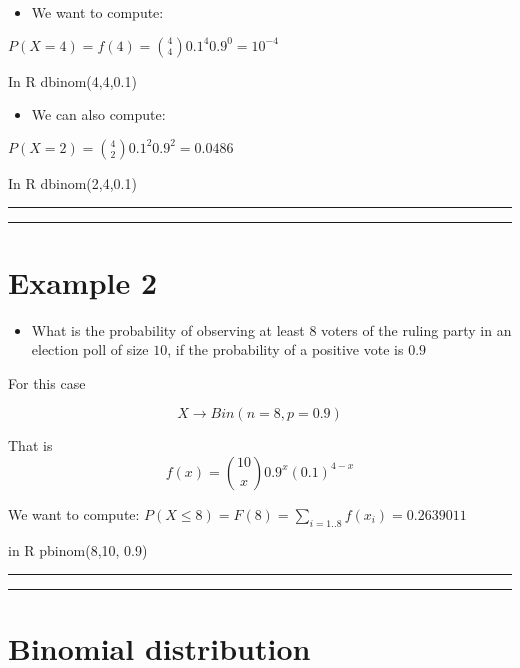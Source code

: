 \documentclass[
]{book}
\providecommand{\tightlist}{%
  \setlength{\itemsep}{0pt}\setlength{\parskip}{0pt}}
\begin{document}
\begin{itemize}
\tightlist
\item
  We want to compute:
\end{itemize}

\(P(X=4)=f(4)=\binom 4 4 0.1^4 0.9^{0}=10^{-4}\)

In R dbinom(4,4,0.1)

\begin{itemize}
\tightlist
\item
  We can also compute:
\end{itemize}

\(P(X=2)=\binom 4 2 0.1^2 0.9^2=0.0486\)

In R dbinom(2,4,0.1)

\begin{center}\rule{0.5\linewidth}{0.5pt}\end{center}

\begin{center}\rule{0.5\linewidth}{0.5pt}\end{center}

\hypertarget{example-2-1}{%
\section{Example 2}\label{example-2-1}}

\begin{itemize}
\tightlist
\item
  What is the probability of observing at least \(8\) voters of the ruling party in an election poll of size \(10\), if the probability of a positive vote is \(0.9\)
\end{itemize}

For this case

\[X \rightarrow Bin(n=8, p=0.9)\]

That is \[f(x)=\binom {10} x 0.9^x(0.1)^{4-x}\]

We want to compute:
\(P(X\le 8)=F(8)= \sum_{i=1..8} f(x_i)=0.2639011\)

in R pbinom(8,10, 0.9)

\begin{center}\rule{0.5\linewidth}{0.5pt}\end{center}

\begin{center}\rule{0.5\linewidth}{0.5pt}\end{center}

\hypertarget{binomial-distribution-3}{%
\section{Binomial distribution}\label{binomial-distribution-3}}
\end{document}
